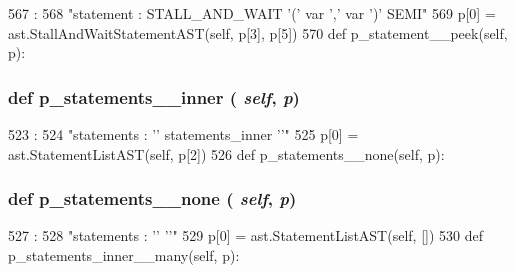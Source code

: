 \begin{DoxyVerb}
\begin{DoxyCode}
567                                             :
568         "statement : STALL_AND_WAIT '(' var ',' var ')' SEMI"
569         p[0] = ast.StallAndWaitStatementAST(self, p[3], p[5])
570 
    def p_statement__peek(self, p):
\end{DoxyCode}
\hypertarget{classslicc_1_1parser_1_1SLICC_a1986800af6f320a790dfee643705ed65}{
\subsubsection[{p\_\-statements\_\-\_\-inner}]{\setlength{\rightskip}{0pt plus 5cm}def p\_\-statements\_\-\_\-inner ( {\em self}, \/   {\em p})}}
\label{classslicc_1_1parser_1_1SLICC_a1986800af6f320a790dfee643705ed65}



\begin{DoxyCode}
523                                     :
524         "statements : '{' statements_inner '}'"
525         p[0] = ast.StatementListAST(self, p[2])
526 
    def p_statements__none(self, p):
\end{DoxyCode}
\hypertarget{classslicc_1_1parser_1_1SLICC_a13b5a28aefa2d0a6cffd77e2a0372f26}{
\subsubsection[{p\_\-statements\_\-\_\-none}]{\setlength{\rightskip}{0pt plus 5cm}def p\_\-statements\_\-\_\-none ( {\em self}, \/   {\em p})}}
\label{classslicc_1_1parser_1_1SLICC_a13b5a28aefa2d0a6cffd77e2a0372f26}



\begin{DoxyCode}
527                                    :
528         "statements : '{' '}'"
529         p[0] = ast.StatementListAST(self, [])
530 
    def p_statements_inner__many(self, p):
\end{DoxyCode}
\hypertarget{classslicc_1_1parser_1_1SLICC_a3f2507fb0d5c325fe894124d2c338ec1}{
}
\end{DoxyVerb}
